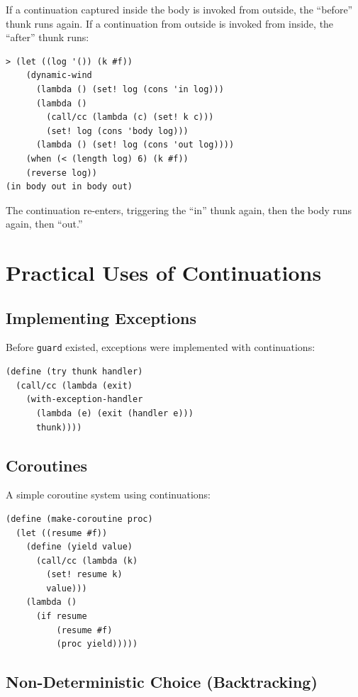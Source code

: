 If a continuation captured inside the body is invoked from outside, the ``before'' thunk runs again. If a continuation from outside is invoked from inside, the ``after'' thunk runs:

\begin{lstlisting}[style=repl]
> (let ((log '()) (k #f))
    (dynamic-wind
      (lambda () (set! log (cons 'in log)))
      (lambda ()
        (call/cc (lambda (c) (set! k c)))
        (set! log (cons 'body log)))
      (lambda () (set! log (cons 'out log))))
    (when (< (length log) 6) (k #f))
    (reverse log))
(in body out in body out)
\end{lstlisting}

The continuation re-enters, triggering the ``in'' thunk again, then the body runs again, then ``out.''

\section{Practical Uses of Continuations}

\subsection{Implementing Exceptions}

Before \texttt{guard} existed, exceptions were implemented with continuations:

\begin{lstlisting}
(define (try thunk handler)
  (call/cc (lambda (exit)
    (with-exception-handler
      (lambda (e) (exit (handler e)))
      thunk))))
\end{lstlisting}

\subsection{Coroutines}

A simple coroutine system using continuations:

\begin{lstlisting}
(define (make-coroutine proc)
  (let ((resume #f))
    (define (yield value)
      (call/cc (lambda (k)
        (set! resume k)
        value)))
    (lambda ()
      (if resume
          (resume #f)
          (proc yield)))))
\end{lstlisting}

\subsection{Non-Deterministic Choice (Backtracking)}

